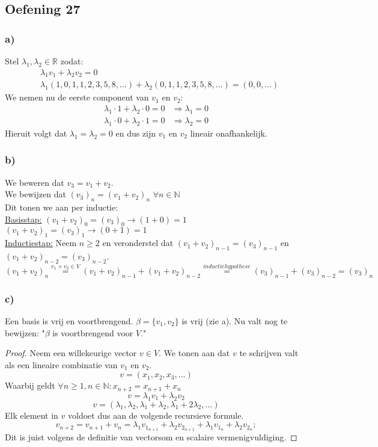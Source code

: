 \documentclass[lineaire_algebra_oplossingen.tex]{subfiles}
\begin{document}
\subsection{Oefening 27}
\subsubsection*{a)}
Stel $\lambda_1,\lambda_2 \in \mathbb{R}$ zodat:
\begin{align*}
&\lambda_1 v_1 + \lambda_2 v_2 = 0 \\
&\lambda_1(1,0,1,1,2,3,5,8,\ldots) + \lambda_2(0,1,1,2,3,5,8,\ldots) =(0,0,\ldots)
\end{align*}
We nemen nu de eerste component van $v_1$ en $v_2$:
\begin{align*}
\lambda_1 \cdot 1 + \lambda_2 \cdot 0 = 0
& \Rightarrow \lambda_1 = 0 \\
\lambda_1 \cdot 0 + \lambda_2 \cdot 1 = 0
& \Rightarrow \lambda_2 = 0
\end{align*}
Hieruit volgt dat $\lambda_1 = \lambda_2 = 0$ en dus zijn $v_1$ en $v_2$ lineair onafhankelijk.
\subsubsection*{b)}
We beweren dat $v_3 = v_1 + v_2$.\\
We bewijzen dat $(v_3)_n = (v_1 + v_2)_n$ \hspace{5pt} $\forall n \in \mathbb{N}$\\
Dit tonen we aan per inductie:\\
\underline{Basisstap:} $(v_1 + v_2)_0 = (v_3)_0 \rightarrow (1 + 0) = 1$\\
\hspace*{4.5em} $(v_1 + v_2)_1 = (v_3)_1 \rightarrow (0 + 1) = 1$\\
\underline{Inductiestap:} Neem $n \geq 2$ en veronderstel dat $(v_1 + v_2)_{n-1} = (v_3)_{n-1}$ en $(v_1 + v_2)_{n-2} = (v_3)_{n-2}$.\\
\[
(v_1 + v_2)_n \overset{v_1 + v_2 \in V}{=} (v_1 + v_2)_{n-1} + (v_1 + v_2)_{n-2} \overset{inductiehypothese}{=} (v_3)_{n-1} + (v_3)_{n-2} = (v_3)_n
\]
\subsubsection*{c)}
Een basis is vrij en voortbrengend. $\beta = \{v_1,v_2\}$ is vrij (zie a).
Nu valt nog te bewijzen: "$\beta$ is voortbrengend voor $V$."
\begin{proof}
Neem een willekeurige vector $v \in V$. We tonen aan dat $v$ te schrijven valt als een lineaire combinatie van $v_1$ en $v_2$.
\[
v=(x_1,x_2,x_3,...)
\]
Waarbij geldt $\forall n \ge 1, n \in \mathbb{N}: x_{n+2}=x_{n+1}+x_n$
\[
v = \lambda_1v_1 + \lambda_2v_2
\]
\[
v = (\lambda_1,\lambda_2,\lambda_1+\lambda_2,\lambda_1+2\lambda_2,...)
\]
Elk element in $v$ voldoet dus aan de volgende recursieve formule.
\[
v_{n+2} = v_{n+1}+v_n=\lambda_1v_{1_{n+1}}+\lambda_2v_{2_{n+1}} + \lambda_1v_{1_{n}}+\lambda_2v_{2_{n}};
\]
Dit is juist volgens de definitie van vectorsom en scalaire vermenigvuldiging.
\end{proof}
\end{document}
